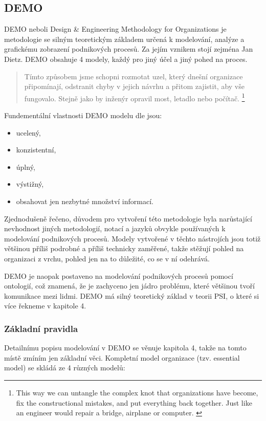 \documentclass[]{article}
\begin{document}
\subsection{DEMO}
DEMO neboli Design \& Engineering Methodology for Organizations je metodologie se silným teoretickým základem určená k modelování, analýze a grafickému zobrazení podnikových procesů. Za jejím vznikem stojí zejména Jan Dietz. DEMO obsahuje 4 modely, každý pro jiný účel a jiný pohed na proces.

\begin{quote}
Tímto způsobem jsme schopni rozmotat uzel,  který dnešní organizace připomínají, odstranit chyby v jejich návrhu a přitom zajistit, aby vše fungovalo. Stejně jako by inženýr opravil most, letadlo nebo počítač. \cite{DEMO_web}
\footnote{This way we can untangle the complex knot that organizations have become, fix the constructional mistakes, and put everything back together. Just like an engineer would repair a bridge, airplane or computer. \cite{DEMO_web}}
\end{quote}

Fundementální vlastnosti DEMO modelu dle \cite{Dietz2006} jsou:

\begin{itemize}
\item ucelený,
\item konzistentní,
\item úplný,
\item výstižný,
\item obsahovat jen nezbytné množství informací.
\end{itemize}

Zjednodušeně řečeno, důvodem pro vytvoření této metodologie byla narůstající nevhodnost jiných metodologií, notací a jazyků obvykle používaných k modelování podnikových procesů. %
Modely vytvořené v těchto nástrojích jsou totiž většinou příliš podrobné a příliš technicky zaměřené, takže stěžují pohled na organizaci z vrchu, pohled jen na to důležité, co se v ní odehrává.

DEMO je naopak postaveno na modelování podnikových procesů pomocí ontologií, což znamená, že je zachyceno jen jádro problému, které většinou tvoří komunikace mezi lidmi. DEMO má silný teoretický základ v teorii PSI, o které si více řekneme v kapitole 4. %

\subsubsection{Základní pravidla}
Detailnímu popisu modelování v DEMO se věnuje kapitola 4, takže na tomto místě zmíním jen základní věci. Kompletní model organizace (tzv. essential model) se skládá ze 4 různých modelů: \cite{Vejrazkova2012}
\end{document}
